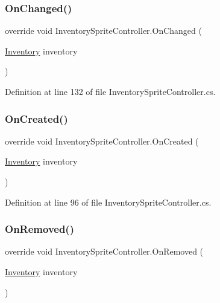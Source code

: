 \subsubsection{\texorpdfstring{On\+Changed()}{OnChanged()}}
{\footnotesize\ttfamily override void Inventory\+Sprite\+Controller.\+On\+Changed (\begin{DoxyParamCaption}\item[{\hyperlink{class_inventory}{Inventory}}]{inventory }\end{DoxyParamCaption})\hspace{0.3cm}{\ttfamily [protected]}}



Definition at line 132 of file Inventory\+Sprite\+Controller.\+cs.

\mbox{\label{class_inventory_sprite_controller_aef9b0fe5cb4a8f1c0a7877a283387721}} 
\subsubsection{\texorpdfstring{On\+Created()}{OnCreated()}}
{\footnotesize\ttfamily override void Inventory\+Sprite\+Controller.\+On\+Created (\begin{DoxyParamCaption}\item[{\hyperlink{class_inventory}{Inventory}}]{inventory }\end{DoxyParamCaption})\hspace{0.3cm}{\ttfamily [protected]}}



Definition at line 96 of file Inventory\+Sprite\+Controller.\+cs.

\mbox{\label{class_inventory_sprite_controller_a32ab66f8a43f6ae5d9a72ca15919c468}} 
\subsubsection{\texorpdfstring{On\+Removed()}{OnRemoved()}}
{\footnotesize\ttfamily override void Inventory\+Sprite\+Controller.\+On\+Removed (\begin{DoxyParamCaption}\item[{\hyperlink{class_inventory}{Inventory}}]{inventory }\end{DoxyParamCaption})\hspace{0.3cm}{\ttfamily [protected]}}



